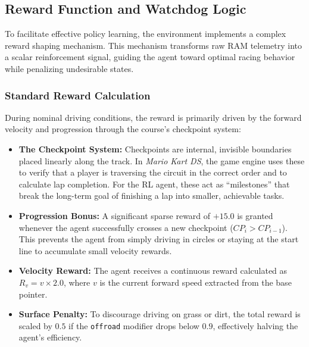 \documentclass[11pt,a4paper]{article}
\begin{document}
\subsection{Reward Function and Watchdog Logic}
To facilitate effective policy learning, the environment implements a complex reward shaping mechanism. This mechanism transforms raw RAM telemetry into a scalar reinforcement signal, guiding the agent toward optimal racing behavior while penalizing undesirable states.

\subsubsection{Standard Reward Calculation}
During nominal driving conditions, the reward is primarily driven by the forward velocity and progression through the course's checkpoint system:
\begin{itemize}
    \item \textbf{The Checkpoint System:} Checkpoints are internal, invisible boundaries placed linearly along the track. In \textit{Mario Kart DS}, the game engine uses these to verify that a player is traversing the circuit in the correct order and to calculate lap completion. For the RL agent, these act as ``milestones'' that break the long-term goal of finishing a lap into smaller, achievable tasks.
    \item \textbf{Progression Bonus:} A significant sparse reward of $+15.0$ is granted whenever the agent successfully crosses a new checkpoint ($CP_i > CP_{i-1}$). This prevents the agent from simply driving in circles or staying at the start line to accumulate small velocity rewards.
    \item \textbf{Velocity Reward:} The agent receives a continuous reward calculated as $R_v = v \times 2.0$, where $v$ is the current forward speed extracted from the base pointer.
    \item \textbf{Surface Penalty:} To discourage driving on grass or dirt, the total reward is scaled by $0.5$ if the \texttt{offroad} modifier drops below $0.9$, effectively halving the agent's efficiency.
\end{itemize}
\end{document}
